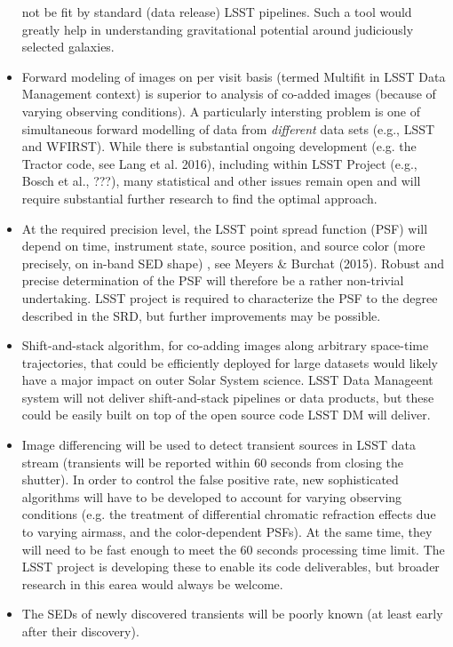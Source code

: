 \documentclass{iau}
\begin{document}
\begin{itemize}
  not be fit by standard (data release) LSST pipelines. Such a tool
  would greatly help in understanding gravitational potential around
  judiciously selected galaxies.
\item Forward modeling of images on per visit basis (termed Multifit
  in LSST Data Management context) is superior to analysis of co-added
  images (because of varying observing conditions).  A particularly
  intersting problem is one of simultaneous forward modelling of data
  from {\em different} data sets (e.g., LSST and WFIRST). While there is
  substantial ongoing development (e.g. the Tractor code, see Lang et
  al. 2016), including within LSST Project (e.g., Bosch et al., ???),
  many statistical and other issues remain open and will require
  substantial further research to find the optimal approach.
\item At the required precision level, the LSST point spread function
  (PSF) will depend on time, instrument state, source position, and
  source color (more precisely, on in-band SED shape) , see Meyers \&
  Burchat (2015). Robust and precise determination of the PSF will
  therefore be a rather non-trivial undertaking. LSST project is
  required to characterize the PSF to the degree described in the SRD,
  but further improvements may be possible.
\item Shift-and-stack algorithm, for co-adding images along arbitrary
  space-time trajectories, that could be efficiently deployed for
  large datasets would likely have a major impact on outer Solar
  System science. LSST Data Manageent system will not deliver
  shift-and-stack pipelines or data products, but these could be easily
  built on top of the open source code LSST DM will deliver.
\item Image differencing will be used to detect transient sources in
  LSST data stream (transients will be reported within 60 seconds from
  closing the shutter). In order to control the false positive rate,
  new sophisticated algorithms will have to be developed to account
  for varying observing conditions (e.g. the treatment of differential
  chromatic refraction effects due to varying airmass, and the
  color-dependent PSFs). At the same time, they will need to be fast
  enough to meet the 60 seconds processing time limit. The LSST project
  is developing these to enable its code deliverables, but broader
  research in this earea would always be welcome.
\item The SEDs of newly discovered transients will be poorly known (at least early after their discovery).

\end{itemize}
\end{document}
